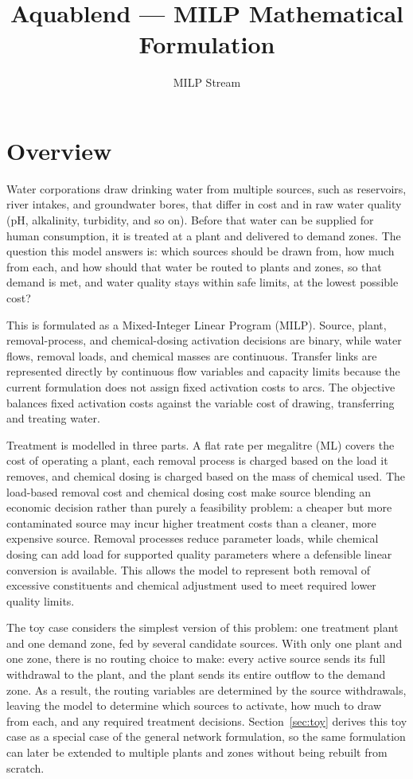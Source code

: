 \documentclass[10pt]{article}
\title{\textbf{Aquablend --- MILP Mathematical Formulation}}
\author{MILP Stream}
\date{}
\begin{document}
\maketitle

\section{Overview}

Water corporations draw drinking water from multiple sources, such as reservoirs, river intakes, and groundwater bores, that differ in cost and in raw water quality (pH, alkalinity, turbidity, and so on).
Before that water can be supplied for human consumption, it is treated at a plant and delivered to demand zones.
The question this model answers is:
which sources should be drawn from, how much from each, and how should that water be routed to plants and zones, so that demand is met, and water quality stays within safe limits, at the lowest possible cost?

This is formulated as a Mixed-Integer Linear Program (MILP).
Source, plant, removal-process, and chemical-dosing activation decisions are binary, while water flows, removal loads, and chemical masses are continuous.
Transfer links are represented directly by continuous flow variables and capacity limits because the current formulation does not assign fixed activation costs to arcs.
The objective balances fixed activation costs against the variable cost of drawing, transferring and treating water.

Treatment is modelled in three parts.
A flat rate per megalitre (ML) covers the cost of operating a plant, each removal process is charged based on the load it removes, and chemical dosing is charged based on the mass of chemical used.
The load-based removal cost and chemical dosing cost make source blending an economic decision rather than purely a feasibility problem:
a cheaper but more contaminated source may incur higher treatment costs than a cleaner, more expensive source.
Removal processes reduce parameter loads, while chemical dosing can add load for supported quality parameters where a defensible linear conversion is available.
This allows the model to represent both removal of excessive constituents and chemical adjustment used to meet required lower quality limits.

The toy case considers the simplest version of this problem:
one treatment plant and one demand zone, fed by several candidate sources.
With only one plant and one zone, there is no routing choice to make:
every active source sends its full withdrawal to the plant, and the plant sends its entire outflow to the demand zone.
As a result, the routing variables are determined by the source withdrawals, leaving the model to determine which sources to activate, how much to draw from each, and any required treatment decisions.
Section~\ref{sec:toy} derives this toy case as a special case of the general network formulation, so the same formulation can later be extended to multiple plants and zones without being rebuilt from scratch.
\end{document}
